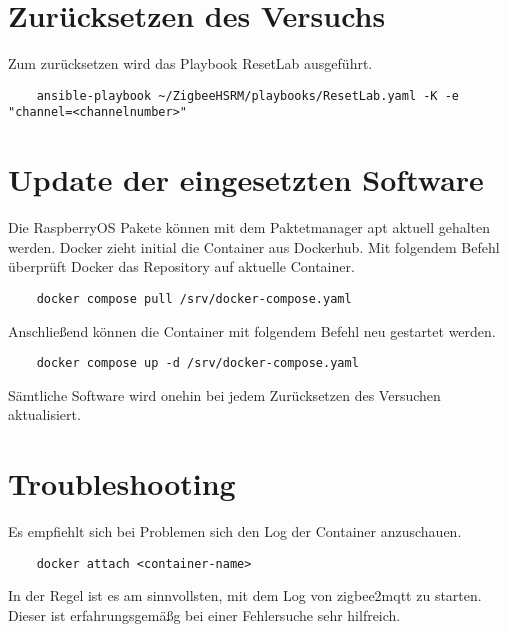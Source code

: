 \section{Zurücksetzen des Versuchs}

Zum zurücksetzen wird das Playbook \grqq ResetLab\grqq{} ausgeführt.

\begin{lstlisting}
    ansible-playbook ~/ZigbeeHSRM/playbooks/ResetLab.yaml -K -e "channel=<channelnumber>"
\end{lstlisting}

\section{Update der eingesetzten Software}

Die RaspberryOS Pakete können mit dem Paktetmanager apt aktuell gehalten werden. Docker zieht initial die Container aus Dockerhub.
Mit folgendem Befehl überprüft Docker das Repository auf aktuelle Container.

\begin{lstlisting}
    docker compose pull /srv/docker-compose.yaml
\end{lstlisting}

Anschließend können die Container mit folgendem Befehl neu gestartet werden.

\begin{lstlisting}
    docker compose up -d /srv/docker-compose.yaml
\end{lstlisting}

Sämtliche Software wird onehin bei jedem Zurücksetzen des Versuchen aktualisiert.

\section{Troubleshooting}

Es empfiehlt sich bei Problemen sich den Log der Container anzuschauen.

\begin{lstlisting}
    docker attach <container-name>
\end{lstlisting}

In der Regel ist es am sinnvollsten, mit dem Log von zigbee2mqtt zu starten. Dieser ist erfahrungsgemäßg bei einer Fehlersuche sehr hilfreich.







